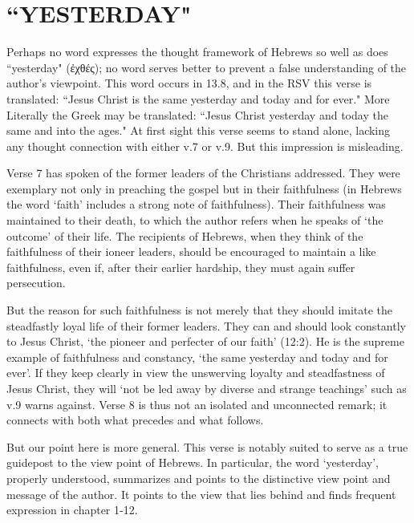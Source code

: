\section{``YESTERDAY"}
Perhaps no word expresses the thought framework of Hebrews so well as does
``yesterday" (ἐχθές); no word serves better to prevent a false understanding of
the author's viewpoint.
This word occurs in 13.8, and in the RSV this verse is translated: ``Jesus
Christ is the same yesterday and today and for ever."
More Literally the Greek may be translated: ``Jesus Christ yesterday and today
the same and into the ages."
At first sight this verse seems to stand alone, lacking any thought connection
with either v.7 or v.9.
But this impression is misleading.
\newline

Verse 7 has spoken of the former leaders of the Christians addressed.
They were exemplary not only in preaching the gospel but in their faithfulness
(in Hebrews the word `faith' includes a strong note of faithfulness).
Their faithfulness was maintained to their death, to which the author refers
when he speaks of `the outcome' of their life.
The recipients of Hebrews, when they think of the faithfulness of their ioneer
leaders, should be encouraged to maintain a like faithfulness, even if, after
their earlier hardship, they must again suffer persecution.
\newline

But the reason for such faithfulness is not merely that they should imitate the
steadfastly loyal life of their former leaders.
They can and should look constantly to Jesus Christ, `the pioneer and perfecter
of our faith' (12:2).
He is the supreme example of faithfulness and constancy, `the same yesterday and
today and for ever'.
If they keep clearly in view the unswerving loyalty and steadfastness of Jesus
Christ, they will `not be led away by diverse and strange teachings' such as v.9
warns against.
Verse 8 is thus not an isolated and unconnected remark; it connects with both
what precedes and what follows.
\newline

But our point here is more general.
This verse is notably suited to serve as a true guidepost to the view point of
Hebrews.
In particular, the word `yesterday', properly understood, summarizes and points
to the distinctive view point and message of the author.
It points to the view that lies behind and finds frequent expression in chapter
1-12.
\newline

